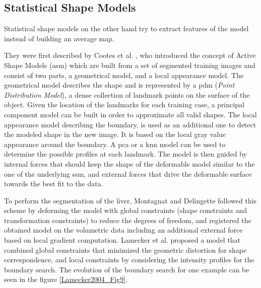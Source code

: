 \subsection{Statistical Shape Models}

Statistical shape models on the other hand try to extract features of
the model instead of building an average map.

They were first described by Cootes et al. \cite{Cootes1995}, 
who introduced the concept of Active Shape Models (\ac{asm}) which
are built from a set of segmented training images and consist of two
parts, a geometrical model, and a local appearance model. The
geometrical model describes the shape and is represented by a \ac{pdm}
(\emph{Point Distribution Model}), a dense collection of landmark points
on the surface of the object. Given the location of the landmarks for
each training case, a principal component model can be built in order to
approximate all valid shapes. The local appearance model describing the
boundary, is used as an additional one to detect the modeled shape in
the new image. It is based on the local gray value appearance around the
boundary. A \ac{pca} or a \ac{knn} model can be used to determine the possible
profiles at each landmark. The model is then guided by internal
forces that should keep the shape of the deformable model similar to the
one of the underlying \ac{ssm}, and external forces that drive the deformable
surface towards the best fit to the data.

To perform the segmentation of the liver, Montagnat and Delingette \cite{Montagnat1997} followed 
this scheme by deforming the model with
global constraints (shape constraints and transformation constraints) to
reduce the degrees of freedom, and registered the obtained model on the
volumetric data including an additional external force based on local
gradient computation.
Lamecker et al. \cite{Lamecker2004} proposed a model that combined global constraints that
minimized the geometric distortion for shape correspondence, and local
constraints by considering the intensity profiles for the boundary
search. The evolution of the boundary search for one example can be seen in the figure \ref{Lamecker2004_Fig9}.

